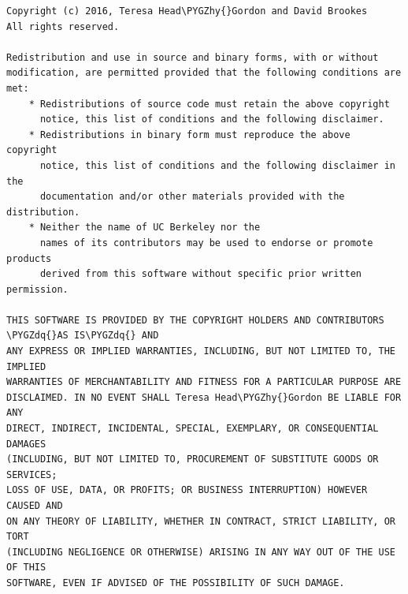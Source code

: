 \documentclass[letterpaper,10pt,english]{sphinxmanual}
\def\PYGZhy{\char`\-}
\def\PYGZdq{\char`\"}
\begin{document}
\begin{Verbatim}[commandchars=\\\{\}]
Copyright (c) 2016, Teresa Head\PYGZhy{}Gordon and David Brookes
All rights reserved.

Redistribution and use in source and binary forms, with or without
modification, are permitted provided that the following conditions are met:
    * Redistributions of source code must retain the above copyright
      notice, this list of conditions and the following disclaimer.
    * Redistributions in binary form must reproduce the above copyright
      notice, this list of conditions and the following disclaimer in the
      documentation and/or other materials provided with the distribution.
    * Neither the name of UC Berkeley nor the
      names of its contributors may be used to endorse or promote products
      derived from this software without specific prior written permission.

THIS SOFTWARE IS PROVIDED BY THE COPYRIGHT HOLDERS AND CONTRIBUTORS \PYGZdq{}AS IS\PYGZdq{} AND
ANY EXPRESS OR IMPLIED WARRANTIES, INCLUDING, BUT NOT LIMITED TO, THE IMPLIED
WARRANTIES OF MERCHANTABILITY AND FITNESS FOR A PARTICULAR PURPOSE ARE
DISCLAIMED. IN NO EVENT SHALL Teresa Head\PYGZhy{}Gordon BE LIABLE FOR ANY
DIRECT, INDIRECT, INCIDENTAL, SPECIAL, EXEMPLARY, OR CONSEQUENTIAL DAMAGES
(INCLUDING, BUT NOT LIMITED TO, PROCUREMENT OF SUBSTITUTE GOODS OR SERVICES;
LOSS OF USE, DATA, OR PROFITS; OR BUSINESS INTERRUPTION) HOWEVER CAUSED AND
ON ANY THEORY OF LIABILITY, WHETHER IN CONTRACT, STRICT LIABILITY, OR TORT
(INCLUDING NEGLIGENCE OR OTHERWISE) ARISING IN ANY WAY OUT OF THE USE OF THIS
SOFTWARE, EVEN IF ADVISED OF THE POSSIBILITY OF SUCH DAMAGE.
\end{Verbatim}

\begin{thebibliography}{BrHe16}
\end{thebibliography}
\end{document}
